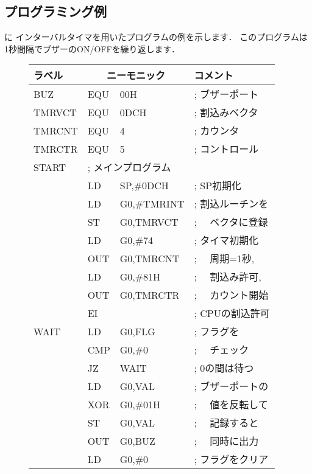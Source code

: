 \subsection{プログラミング例}
に
インターバルタイマを用いたプログラムの例を示します．
このプログラムは1秒間隔でブザーのON/OFFを繰り返します．

\begin{figure}[btp]
{\small\tt\begin{center}
\begin{tabular}{|l|l l l|} \hline
ラベル & \multicolumn{2}{|c}{ニーモニック} & コメント      \\
\hline
BUZ   & EQU   & 00H               & ; ブザーポート   \\
TMRVCT& EQU   & 0DCH              & ; 割込みベクタ   \\
TMRCNT& EQU   & 4                 & ; カウンタ       \\
TMRCTR& EQU   & 5                 & ; コントロール   \\
START & \multicolumn{3}{|l|}{; メインプログラム}     \\
      & LD    & SP,\#0DCH         & ; SP初期化       \\
      & LD    & G0,\#TMRINT       & ; 割込ルーチンを \\
      & ST    & G0,TMRVCT         & ; 　ベクタに登録 \\
      & LD    & G0,\#74           & ; タイマ初期化   \\
      & OUT   & G0,TMRCNT         & ; 　周期=1秒,    \\
      & LD    & G0,\#81H          & ; 　割込み許可,  \\
      & OUT   & G0,TMRCTR	  & ; 　カウント開始 \\
      & EI    &                   & ; CPUの割込許可  \\
WAIT  & LD    & G0,FLG            & ; フラグを       \\
      & CMP   & G0,\#0            & ; 　チェック     \\
      & JZ    & WAIT              & ; 0の間は待つ    \\
      & LD    & G0,VAL            & ; ブザーポートの \\
      & XOR   & G0,\#01H          & ; 　値を反転して \\
      & ST    & G0,VAL            & ; 　記録すると   \\
      & OUT   & G0,BUZ            & ; 　同時に出力   \\
      & LD    & G0,\#0            & ; フラグをクリア \\

\end{tabular}
\end{center}}
\end{figure}
